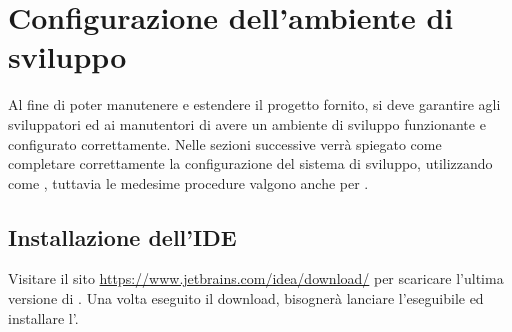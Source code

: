 \documentclass[12pt,a4paper]{article}
\begin{document}
	
	\newpage
	\section{Configurazione dell'ambiente di sviluppo}
	Al fine di poter manutenere e estendere il progetto fornito, si deve garantire agli sviluppatori ed ai manutentori di avere un ambiente di sviluppo funzionante e configurato correttamente.
	Nelle sezioni successive verrà spiegato come completare correttamente la configurazione del sistema di sviluppo, utilizzando come   , tuttavia le medesime procedure valgono anche per  .  
	
	\subsection{Installazione dell'IDE}
	Visitare il sito \url{https://www.jetbrains.com/idea/download/} per scaricare l'ultima versione di  .
	Una volta eseguito il download, bisognerà lanciare l'eseguibile ed installare l'.
	
	\newpage
\end{document}
